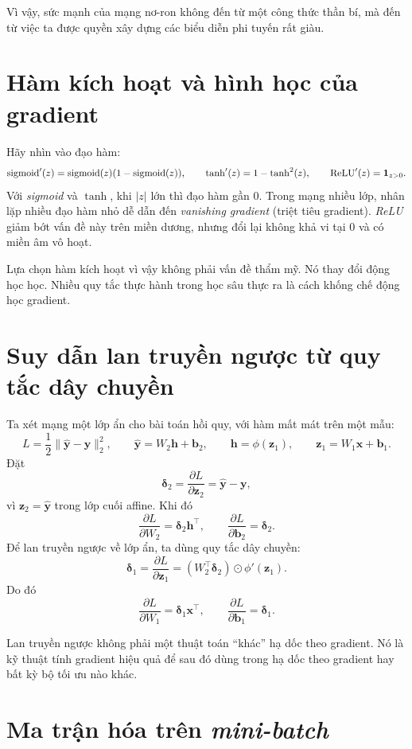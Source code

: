 Vì vậy, sức mạnh của mạng nơ-ron không đến từ một công thức thần bí, mà đến từ việc ta được quyền xây dựng các biểu diễn phi tuyến rất giàu.

\section{Hàm kích hoạt và hình học của gradient}

Hãy nhìn vào đạo hàm:
\[
\mathrm{sigmoid}'(z)=\mathrm{sigmoid}(z)(1-\mathrm{sigmoid}(z)),
\qquad
\mathrm{tanh}'(z)=1-\tanh^2(z),
\qquad
\mathrm{ReLU}'(z)=\mathbf{1}_{z>0}.
\]
Với \emph{sigmoid} và \(\tanh\), khi \(|z|\) lớn thì đạo hàm gần 0. Trong mạng nhiều lớp, nhân lặp nhiều đạo hàm nhỏ dễ dẫn đến \emph{vanishing gradient} (triệt tiêu gradient). \emph{ReLU} giảm bớt vấn đề này trên miền dương, nhưng đổi lại không khả vi tại 0 và có miền âm vô hoạt.

Lựa chọn hàm kích hoạt vì vậy không phải vấn đề thẩm mỹ. Nó thay đổi động học học. Nhiều quy tắc thực hành trong học sâu thực ra là cách khống chế động học gradient.

\section{Suy dẫn lan truyền ngược từ quy tắc dây chuyền}

Ta xét mạng một lớp ẩn cho bài toán hồi quy, với hàm mất mát trên một mẫu:
\[
L = \frac{1}{2}\|\hat{\bm{y}}-\bm{y}\|_2^2,
\qquad
\hat{\bm{y}} = W_2\bm{h}+\bm{b}_2,
\qquad
\bm{h} = \phi(\bm{z}_1),
\qquad
\bm{z}_1 = W_1\bm{x}+\bm{b}_1.
\]
Đặt
\[
\bm{\delta}_2 = \frac{\partial L}{\partial \bm{z}_2}
=
\hat{\bm{y}}-\bm{y},
\]
vì \(\bm{z}_2=\hat{\bm{y}}\) trong lớp cuối affine. Khi đó
\[
\frac{\partial L}{\partial W_2} = \bm{\delta}_2 \bm{h}^\top,
\qquad
\frac{\partial L}{\partial \bm{b}_2}=\bm{\delta}_2.
\]
Để lan truyền ngược về lớp ẩn, ta dùng quy tắc dây chuyền:
\[
\bm{\delta}_1
=
\frac{\partial L}{\partial \bm{z}_1}
=
\left(W_2^\top \bm{\delta}_2\right)\odot \phi'(\bm{z}_1).
\]
Do đó
\[
\frac{\partial L}{\partial W_1}=\bm{\delta}_1 \bm{x}^\top,
\qquad
\frac{\partial L}{\partial \bm{b}_1}=\bm{\delta}_1.
\]

\begin{remark}
Lan truyền ngược không phải một thuật toán ``khác'' hạ dốc theo gradient. Nó là kỹ thuật tính gradient hiệu quả để sau đó dùng trong hạ dốc theo gradient hay bất kỳ bộ tối ưu nào khác.
\end{remark}

\section{Ma trận hóa trên \emph{mini-batch}}

